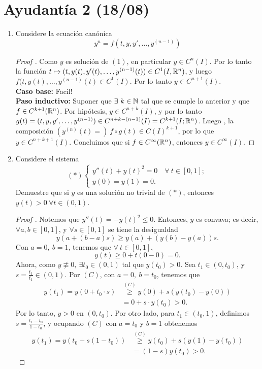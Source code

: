 
	\section{Ayudantía 2 (18/08)}

	\begin{enumerate}
		\item Considere la ecuación canónica
		\[
		y^{n} = f(t,y,y',\dots,y^{(n-1)}) \tag{1}
		\]
		\begin{proof}[Proof ]
			Como $y$ es solución de $(1)$, en particular $y \in C^n(I)$. Por lo tanto la función $t \mapsto (t,y(t),y'(t),\dots,y^{(n-1)}(t)) \in C^1 (I,\mathbb{R}^n)$, y luego  $f(t,y(t),\dots, y^{(n-1)}(t) \in C^1(I)$. Por lo tanto $y \in C^{n+1}(I)$. \\
			\noindent {} \textbf{Caso base:} Facil! \\
			\noindent \textbf{Paso inductivo:} Suponer que $\exists\ k \in \mathbb{N}$ tal que se cumple lo anterior y que $f \in C^{k+1}(\mathbb{R}^n)$. Por hipótesis, $y \in C^{n+k}(I)$, y por lo tanto $g(t) = (t,y,y',\dots,y^{(n-1)}) \in C^{n+k-(n-1)}(I) = C^{k+1}(I;\mathbb{R}^n)$. Luego , la composición $(y^{(n)}(t) =)\ f \circ g (t) \in C(I)^{k+1}$, por lo que $y \in C^{n+k+1}(I)$. Concluimos que si $f \in C^{\infty}(\mathbb{R}^n)$, entonces $y \in C^{\infty}(I)$.
		\end{proof}

		\item Considere el sistema
		\[
		(*) \begin{cases}
			y''(t) + y(t)^2 = 0 \quad \forall\ t \in [0,1]; \\
			y(0) = y(1) = 0.
		\end{cases}
		\]
		Demuestre que si $y$ es una solución no trivial de $(*)$, entonces $y(t) > 0 \ \forall t \in (0,1)$.
		\begin{proof}[Proof ]
			Notemos que $y''(t) = -y(t)^2 \leq 0$. Entonces, $y$ es convava; es decir, $\forall a,b\in [0,1]$, y $\forall s \in [0,1]$ se tiene la desigualdad
			\[
			y(a+(b-a)s) \geq y(a) + (y(b)-y(a))s. \tag{$C$}
			\]
			\noindent Con $a=0,\ b=1$, tenemos que $\forall \ t \in [0,1]$,
			\[
			y(t) \geq 0 + t(0 - 0) = 0.
			\]
			\noindent Ahora, como $y \not\equiv 0,\ \exists t_0 \in (0,1)$ tal que $y(t_0) > 0$. Sea $t_1 \in (0,t_0)$, y $s = \frac{t_1}{t_1} \in (0,1)$. Por $(C)$, con $a = 0,\ b=t_0$, tenemos que
			\begin{align*}
				y(t_1) = y(0 + t_0\cdot s) & \stackrel{(C)}{\geq} y(0) + s(y(t_0)-y(0)) \\
				& = 0 + s \cdot y(t_0) > 0
			.\end{align*}
			\noindent Por lo tanto, $y > 0$ en $(0,t_0)$. Por otro lado, para $t_1 \in (t_0, 1)$, definimos $s = \frac{t_1 - t_0}{1-t_0}$, y ocupando $(C)$ con $a = t_0$ y $b = 1$ obtenemos
			\begin{align*}
				y(t_1) = y(t_0 + s(1-t_0)) & \stackrel{(C)}{\geq} y(t_0) + s(y(1)-y(t_0)) \\
				& = (1-s)y(t_0) > 0
			.\end{align*}
		\end{proof}


\end{enumerate}
